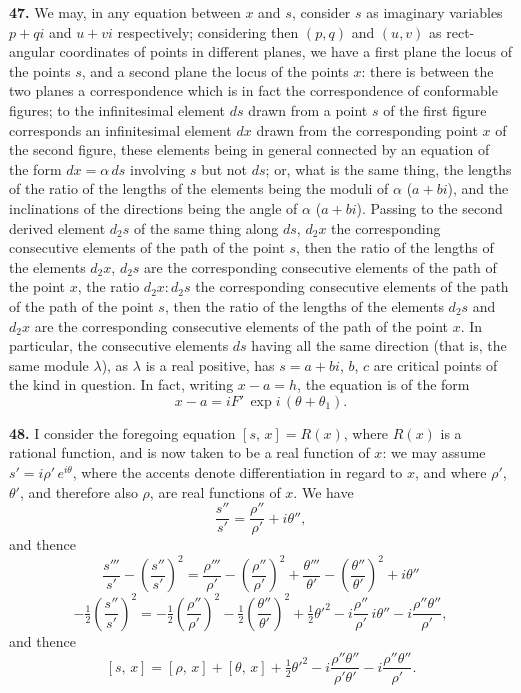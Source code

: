 \documentclass[11pt]{article}
\newcommand{\artno}[1]{\textbf{#1.}\quad}
\begin{document}
\artno{47} We may, in any equation between $x$ and $s$, consider $s$ as imaginary
variables $p + qi$ and $u + vi$ respectively; considering then $(p, q)$ and $(u, v)$ as rect-
angular coordinates of points in different planes, we have a first plane the locus of
the points $s$, and a second plane the locus of the points $x$: there is between the
two planes a correspondence which is in fact the correspondence of conformable
figures; to the infinitesimal element $ds$ drawn from a point $s$ of the first figure
corresponds an infinitesimal element $dx$ drawn from the corresponding point $x$ of the
second figure, these elements being in general connected by an equation of the
form $dx = \alpha\,ds$ involving $s$ but not $ds$; or, what is the same thing, the lengths of the
ratio of the lengths of the elements being the moduli of $\alpha$ ($a + bi$), and
the inclinations of the directions being the angle of $\alpha$ ($a + bi$). Passing to the
second derived element $d_{2}s$ of the same thing along $ds$, $d_{2}x$ the corresponding consecutive elements of the path of the point $s$, then the
ratio of the lengths of the elements $d_{2}x$, $d_{2}s$ are the corresponding consecutive elements of the path of the point $x$, the
ratio $d_{2}x : d_{2}s$ the corresponding consecutive elements of the path of the path of the point $s$, then the
ratio of the lengths of the elements $d_{2}s$ and $d_{2}x$ are the corresponding consecutive elements of the path of the point $x$. In particular, the consecutive elements $ds$
having all the same direction (that is, the same module $\lambda$), as $\lambda$ is a real
positive, has $s = a + bi$, $b$, $c$ are critical points of the kind in question. In fact, writing
$x - a = h$, the equation is of the form
\[
   x - a = i F'\,\exp i\,(\theta + \theta_{1}).
\]

\newpage
\artno{48} I consider the foregoing equation $[s,\,x] = R(x)$, where $R(x)$ is a rational
function, and is now taken to be a real function of $x$: we may assume $s' = i\rho'\,e^{i\theta}$,
where the accents denote differentiation in regard to $x$, and where $\rho'$, $\theta'$, and therefore also $\rho$, are real functions of $x$. We have
\[
   \frac{s''}{s'} = \frac{\rho''}{\rho'} + i\theta'',
\]
and thence
\[
   \frac{s'''}{s'} - \left(\frac{s''}{s'}\right)^{\!2} = \frac{\rho'''}{\rho'} - \left(\frac{\rho''}{\rho'}\right)^{\!2} + \frac{\theta'''}{\theta'} - \left(\frac{\theta''}{\theta'}\right)^{\!2} + i\theta''
\]
\[
   -\tfrac{1}{2}\!\left(\frac{s''}{s'}\right)^{\!2} = -\tfrac{1}{2}\!\left(\frac{\rho''}{\rho'}\right)^{\!2} - \tfrac{1}{2}\!\left(\frac{\theta''}{\theta'}\right)^{\!2} + \tfrac{1}{2}\theta'^{2} - i\frac{\rho''}{\rho'}\,i\theta'' - i\frac{\rho''\theta''}{\rho'},
\]
and thence
\[
   [s,\,x] = [\rho,\,x] + [\theta,\,x] + \tfrac{1}{2}\theta'^{2} - i\frac{\rho''\theta''}{\rho'\theta'} - i\frac{\rho''\theta''}{\rho'}.
\]
\end{document}
